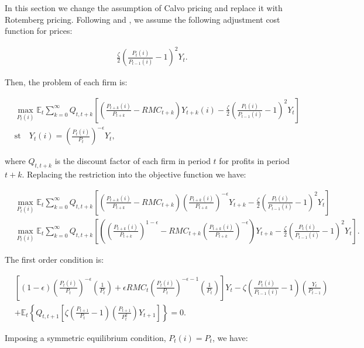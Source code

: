 \documentclass[11pt]{article}
\numberwithin{equation}{section}
\begin{document}
In this section we change the assumption of Calvo pricing and replace it with Rotemberg pricing. Following \cite{AscariEtAl2012} and \cite{Rotemberg1982}, we assume the following adjustment cost function for prices:

\begin{align*}
\frac{\zeta}{2}\left(\frac{P_t(i)}{P_{t-1}(i)}-1\right)^2Y_t.
\end{align*}

Then, the problem of each firm is:

\begin{align*}
&\max_{P_t(i)} \mathbb{E}_t \sum_{k=0}^{\infty}Q_{t,t+k}\left[\left(\frac{P_{t+k}(i)}{P_{t+k}} - RMC_{t+k} \right)Y_{t+k}(i) - \frac{\zeta}{2}\left(\frac{P_t(i)}{P_{t-1}(i)}-1\right)^2Y_t\right]\\
&\text{st} \quad Y_t(i)=\left(\frac{P_t(i)}{P_t}\right)^{-\epsilon}Y_t,
\end{align*}

where $Q_{t,t+k}$ is the discount factor of each firm in period $t$ for profits in period $t+k$. Replacing the restriction into the objective function we have:

\begin{align*}
&\max_{P_t(i)} \mathbb{E}_t \sum_{k=0}^{\infty}Q_{t,t+k}\left[\left(\frac{P_{t+k}(i)}{P_{t+k}} - RMC_{t+k} \right)\left(\frac{P_{t+k}(i)}{P_{t+k}}\right)^{-\epsilon}Y_{t+k} - \frac{\zeta}{2}\left(\frac{P_t(i)}{P_{t-1}(i)}-1\right)^2Y_t\right]\\
&\max_{P_t(i)} \mathbb{E}_t \sum_{k=0}^{\infty}Q_{t,t+k}\left[\left(\left(\frac{P_{t+k}(i)}{P_{t+k}}\right)^{1-\epsilon} - RMC_{t+k}\left(\frac{P_{t+k}(i)}{P_{t+k}}\right)^{-\epsilon} \right)Y_{t+k} - \frac{\zeta}{2}\left(\frac{P_t(i)}{P_{t-1}(i)}-1\right)^2Y_t\right].
\end{align*}

The first order condition is:

\begin{align*}
&\left[(1-\epsilon)\left(\frac{P_{t}(i)}{P_{t}}\right)^{-\epsilon}\left(\frac{1}{P_t}\right)+\epsilon RMC_t \left(\frac{P_{t}(i)}{P_{t}}\right)^{-\epsilon-1}\left(\frac{1}{P_t}\right)\right]Y_t-\zeta\left(\frac{P_t(i)}{P_{t-1}(i)}-1\right)\left(\frac{Y_t}{P_{t-1}}\right)\\
&+\mathbb{E}_t\left\{Q_{t,t+1}\left[\zeta\left(\frac{P_{t+1}}{P_t}-1\right)\left(\frac{P_{t+1}}{P_t^2}\right)Y_{t+1}\right]\right\}=0.
\end{align*}

Imposing a symmetric equilibrium condition, $P_t(i)=P_t$, we have:
\end{document}
